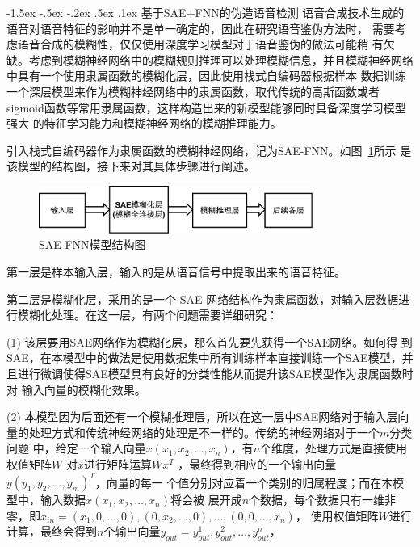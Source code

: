 \documentclass[12pt, a4paper]{article}
\makeatletter
\newcommand*{\hei}{\CJKfamily{zhhei}}
\newcommand{\sihao}{\fontsize{14pt}{\baselineskip}\selectfont}
\renewcommand\section{\@startsection{section}{1}{\z@}%
{-1.5ex \@plus -.5ex \@minus -.2ex}%
{.5ex \@plus .1ex}%
{\normalfont\sihao\bf\hei}}
\makeatother
\begin{document}
\section{基于SAE+FNN的伪造语音检测}
语音合成技术生成的语音对语音特征的影响并不是单一确定的，因此在研究语音鉴伪方法时，
需要考虑语音合成的模糊性，仅仅使用深度学习模型对于语音鉴伪的做法可能稍
有欠缺。考虑到模糊神经网络中的模糊规则推理可以处理模糊信息，并且模糊神经网络
中具有一个使用隶属函数的模糊化层，因此使用栈式自编码器根据样本
数据训练一个深层模型来作为模糊神经网络中的隶属函数，取代传统的高斯函数或者
sigmoid函数等常用隶属函数，这样构造出来的新模型能够同时具备深度学习模型强大
的特征学习能力和模糊神经网络的模糊推理能力。
\par
引入栈式自编码器作为隶属函数的模糊神经网络，记为SAE-FNN。如图~\ref{fig:3}所示
是该模型的结构图，接下来对其具体步骤进行阐述。
\par
\begin{figure}[htbp] %
	\centering
	\includegraphics[width=0.8\textwidth]{SAE-FNN模型结构图.png} %
	\caption{SAE-FNN模型结构图}
	\label{fig:3}
\end{figure}
\par
第一层是样本输入层，输入的是从语音信号中提取出来的语音特征。
\par
第二层是模糊化层，采用的是一个 SAE 网络结构作为隶属函数，对输入层数据进
行模糊化处理。在这一层，有两个问题需要详细研究：
\par
(1) 该层要用SAE网络作为模糊化层，那么首先要先获得一个SAE网络。如何得
到SAE，在本模型中的做法是使用数据集中所有训练样本直接训练一个SAE模型，并
且进行微调使得SAE模型具有良好的分类性能从而提升该SAE模型作为隶属函数时对
输入向量的模糊化效果。
\par
(2) 本模型因为后面还有一个模糊推理层，所以在这一层中SAE网络对于输入层向
量的处理方式和传统神经网络的处理是不一样的。传统的神经网络对于一个$m$分类问题
中，给定一个输入向量$x(x_1, x_2,\ldots, x_n)$，有$n$个维度，处理方式是直接使用权值矩阵$W$
对$x$进行矩阵运算$W x^T$ ，最终得到相应的一个输出向量$y(y_1, y_2,...,y_m)^T$，向量的每一
个值分别对应着一个类别的归属程度；而在本模型中，输入数据$x(x_1, x_2,\ldots, x_n)$将会被
展开成$n$个数据，每个数据只有一维非零，即$x_{in}={(x_1,0,\ldots,0),(0,x_2,\ldots,0),\ldots,(0,0,\ldots,x_n)}$，
使用权值矩阵$W$进行计算，最终会得到$n$个输出向量$y_{out}=y_{out}^{1},y_{out}^{2},\ldots,y_{out}^{n}$，
\end{document}
